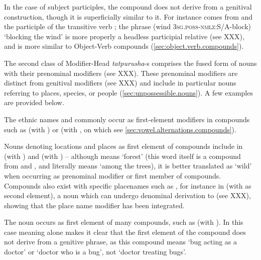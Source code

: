 In the case of subject participles, the compound does not derive from a genitival construction, though it is superficially similar to it. For instance  comes from  and the participle  of the transitive verb ; the phrase  (wind \textsc{3sg.poss}-\textsc{nmlz}:S/A-block) `blocking the wind' is more properly a headless participial relative (see XXX), and is more similar to Object-Verb compounds (\ref{sec:object.verb.compounds}).

The second class of Modifier-Head \textit{tatpurusha}-s comprises the fused form of nouns with their prenominal modifiers (see XXX). These prenominal modifiers are distinct from genitival modifiers (see XXX) and include in particular nouns referring to places, species, or people (\ref{sec:unpossessible.nouns}). A few examples are provided below. 

The ethnic names  and  commonly occur as first-element modifiers in compounds such as  (with ) or (with , on which see \ref{sec:vowel.alternations.compounds}). 

Nouns denoting locations and places as first element of compounds include  in  (with ) and  (with ) -- although  means `forest' (this word itself is a compound from  and , and literally means `among the trees), it is better translated as `wild' when occurring as prenominal modifier or first member of compounds. Compounds also exist with specific placenames such as , for instance in  (with   as second element), a noun which can undergo denominal derivation to   (see XXX), showing that the place name modifier has been integrated.

The noun  occurs as first element of many compounds, such as  (with ). In this case meaning alone makes it clear that the  first element of the compound does not derive from a genitive phrase, as this compound means `bug acting as a doctor' or `doctor who is a bug', not `doctor treating bugs'.

